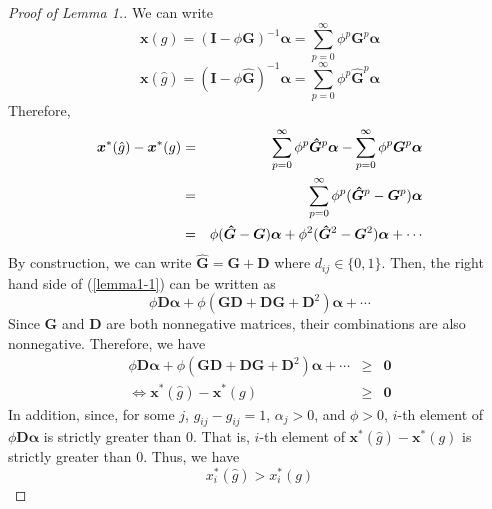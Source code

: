 \documentclass[12pt]{article}
\theoremstyle{definition}
\begin{document}
\begin{proof}[Proof of Lemma 1.]
	We can write
	\[ \bm{x}(g) = {(\bm{I} - \phi \bm{G})}^{-1} \bm{\alpha} = \sum_{p=0}^{\infty} \phi^p \bm{G}^p \bm{\alpha} \]
	\[ \bm{x}(\hat{g}) = {(\bm{I} - \phi \bm{\hat{G}})}^{-1} \bm{\alpha} = \sum_{p=0}^{\infty} \phi^p \bm{\hat{G}}^p \bm{\alpha} \]
	Therefore,
	\begin{eqnarray}
		\label{lemma1-1}
		\bm{x}^*(\hat{g}) - \bm{x}^*(g) &=& \sum_{p=0}^{\infty} \phi^p \bm{\hat{G}}^p \bm{\alpha} - \sum_{p=0}^{\infty} \phi^p \bm{G}^p \bm{\alpha} \notag \\
										&=& \sum_{p=0}^{\infty} \phi^p (\bm{\hat{G}}^p - \bm{G}^p) \bm{\alpha} \notag \\
										&=& \phi (\bm{\hat{G}} - \bm{G}) \bm{\alpha} + \phi^2 (\bm{\hat{G}}^2 - \bm{G}^2) \bm{\alpha} + \cdots
	\end{eqnarray}
	By construction, we can write $\bm{\hat{G}} = \bm{G} + \bm{D}$ where $d_{ij} \in \{0,1\}$.
	Then, the right hand side of (\ref{lemma1-1}) can be written as
	\[ \phi \bm{D} \bm{\alpha} + \phi (\bm{G} \bm{D} + \bm{D} \bm{G} + \bm{D}^2) \bm{\alpha} + \cdots \]
	Since $\bm{G}$ and $\bm{D}$ are both nonnegative matrices, their combinations are also nonnegative.
	Therefore, we have
	\begin{eqnarray*}
		\phi \bm{D} \bm{\alpha} + \phi (\bm{G} \bm{D} + \bm{D} \bm{G} + \bm{D}^2) \bm{\alpha} + \cdots &\ge& \bm{0} \\
		\Leftrightarrow \bm{x}^*(\hat{g}) - \bm{x}^*(g) &\ge& \bm{0}
	\end{eqnarray*}
	In addition, since, for some $j$, $\hat{g}_{ij} - g_{ij} = 1$, $\alpha_j > 0$, and $\phi > 0$, $i$-th element of $\phi \bm{D} \bm{\alpha}$ is strictly greater than $0$.
	That is, $i$-th element of $\bm{x}^*(\hat{g}) - \bm{x}^*(g)$ is strictly greater than $0$.
	Thus, we have
	\[ x_i^*(\hat{g}) > x_i^*(g) \]
\end{proof}
\end{document}
